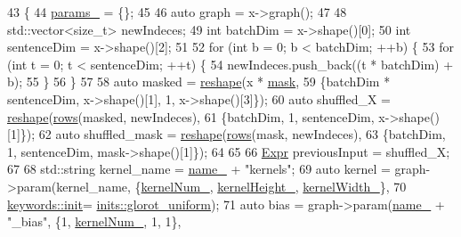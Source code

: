 \begin{DoxyCode}
43                                        \{
44       \hyperlink{classmarian_1_1Convolution_a6a56e7a677386b591a1622732f53ae9a}{params\_} = \{\};
45 
46       \textcolor{keyword}{auto} graph = x->graph();
47 
48       std::vector<size\_t> newIndeces;
49       \textcolor{keywordtype}{int} batchDim = x->shape()[0];
50       \textcolor{keywordtype}{int} sentenceDim = x->shape()[2];
51 
52       \textcolor{keywordflow}{for} (\textcolor{keywordtype}{int} b = 0; b < batchDim; ++b) \{
53         \textcolor{keywordflow}{for} (\textcolor{keywordtype}{int} t = 0; t < sentenceDim; ++t) \{
54           newIndeces.push\_back((t * batchDim) + b);
55         \}
56       \}
57 
58       \textcolor{keyword}{auto} masked = \hyperlink{namespacemarian_acd984f43188d0ae23c2a6ef13ae5293f}{reshape}(x * \hyperlink{namespacemarian_1_1keywords_a201bea6bea8108889b63081132cc3cd7}{mask},
59                             \{batchDim * sentenceDim, x->shape()[1], 1, x->shape()[3]\});
60       \textcolor{keyword}{auto} shuffled\_X = \hyperlink{namespacemarian_acd984f43188d0ae23c2a6ef13ae5293f}{reshape}(\hyperlink{namespacemarian_ace1e9a63d52edc363d70d661cf8d0257}{rows}(masked, newIndeces),
61                                      \{batchDim, 1, sentenceDim, x->shape()[1]\});
62       \textcolor{keyword}{auto} shuffled\_mask = \hyperlink{namespacemarian_acd984f43188d0ae23c2a6ef13ae5293f}{reshape}(\hyperlink{namespacemarian_ace1e9a63d52edc363d70d661cf8d0257}{rows}(mask, newIndeces),
63                                    \{batchDim, 1, sentenceDim, mask->shape()[1]\});
64 
65 
66       \hyperlink{namespacemarian_a498d8baf75b754011078b890b39c8e12}{Expr} previousInput = shuffled\_X;
67 
68       std::string kernel\_name = \hyperlink{classmarian_1_1Convolution_adf629c3e64cd0bd05a742543144512d5}{name\_} + \textcolor{stringliteral}{"kernels"};
69       \textcolor{keyword}{auto} kernel = graph->param(kernel\_name,  \{\hyperlink{classmarian_1_1Convolution_aaf7c9a32c5b843d261548abcedd2f25d}{kernelNum\_}, 
      \hyperlink{classmarian_1_1Convolution_aa2e7a504274fbe1bd24fce5fe89d6ff7}{kernelHeight\_}, \hyperlink{classmarian_1_1Convolution_a4b65ffe7fe84099465ecf6e0e402f4aa}{kernelWidth\_}\},
70                                   \hyperlink{namespacemarian_1_1keywords_afdd3807e3d6fe2bc979d11fa0cf3ee3e}{keywords::init}=
      \hyperlink{namespacemarian_1_1inits_a8838c47537f434b855491cd3ed97ccd1}{inits::glorot\_uniform});
71       \textcolor{keyword}{auto} bias = graph->param(\hyperlink{classmarian_1_1Convolution_adf629c3e64cd0bd05a742543144512d5}{name\_} + \textcolor{stringliteral}{"\_bias"},  \{1, \hyperlink{classmarian_1_1Convolution_aaf7c9a32c5b843d261548abcedd2f25d}{kernelNum\_}, 1, 1\},

\end{DoxyCode}
